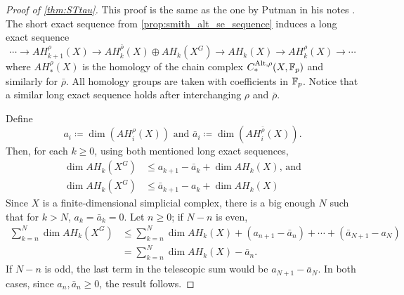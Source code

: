 \documentclass[a4paper,12pt]{amsart}
\begin{document}
\begin{proof}[Proof of \cref{thm:STtau}]
    This proof is the same as the one by Putman in his notes \cite{PutmanSTnotes}.
    The short exact sequence from \cref{prop:smith_alt_se_sequence} induces a long exact sequence
    \[\cdots\rightarrow AH_{k+1}^\rho(X) \rightarrow AH_k^{\bar\rho}(X) \oplus AH_k(X^G) \rightarrow AH_k(X) \to AH_k^\rho(X) \rightarrow\cdots\]
    where $AH_*^{\rho}(X)$ is the homology of the chain complex $C_*^{\textnormal{Alt},\rho}(X,\mathbb{F}_p)$ and similarly for $\bar\rho$.
    All homology groups are taken with coefficients in $\mathbb{F}_p$.
    Notice that a similar long exact sequence holds after interchanging $\rho$ and $\bar\rho$.
    
    Define
    $$a_i \coloneqq \dim (AH_i^{\rho}(X)) \text{ and } \bar a_i \coloneqq \dim (AH_i^{\bar\rho}(X)).$$
    Then, for each $k\geq 0$, using both mentioned long exact sequences,
    \begin{align*}
        \dim AH_k(X^G) &\leq a_{k+1} - \bar a_k + \dim AH_k(X) \text{, and}\\
        \dim AH_k(X^G) &\leq \bar a_{k+1} - a_k +  \dim AH_k(X)
    \end{align*}
    Since $X$ is a finite-dimensional simplicial complex, there is a big enough $N$ such that for $k>N$, $a_k = \bar a_k = 0$. 
    Let $n \geq 0$; if $N-n$ is even,
    \begin{align*}
        \sum_{k=n}^N \dim AH_k(X^G)& \leq \sum_{k=n}^N\dim AH_k(X) + (a_{n+1} - \bar a_n) + 
        \cdots + (\bar a_{N+1} - a_N) \\ & =  \sum_{k=n}^N\dim AH_k(X) - \bar a_{n}.
    \end{align*}
    If $N - n$ is odd, the last term in the telescopic sum would be $a_{N+1} - \bar a_N$.
    In both cases, since $a_n,\bar a_n\geq 0$, the result follows.
\end{proof}



\end{document}
